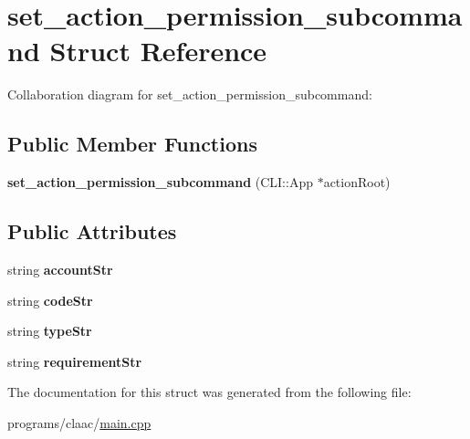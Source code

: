 \hypertarget{structset__action__permission__subcommand}{}\section{set\+\_\+action\+\_\+permission\+\_\+subcommand Struct Reference}
\label{structset__action__permission__subcommand}


Collaboration diagram for set\+\_\+action\+\_\+permission\+\_\+subcommand\+:
\subsection*{Public Member Functions}
\begin{DoxyCompactItemize}
\item 
\mbox{\label{structset__action__permission__subcommand_a21e2eff93402582965baf60440fb85b0}} 
{\bfseries set\+\_\+action\+\_\+permission\+\_\+subcommand} (C\+L\+I\+::\+App $\ast$action\+Root)
\end{DoxyCompactItemize}
\subsection*{Public Attributes}
\begin{DoxyCompactItemize}
\item 
\mbox{\label{structset__action__permission__subcommand_a19502b8e613dc2fc4f86e2583b04890c}} 
string {\bfseries account\+Str}
\item 
\mbox{\label{structset__action__permission__subcommand_af7f56bf710dd0532b918e9ba68e272ec}} 
string {\bfseries code\+Str}
\item 
\mbox{\label{structset__action__permission__subcommand_abe45d0fe0fe2f85e116e1ab5db3de828}} 
string {\bfseries type\+Str}
\item 
\mbox{\label{structset__action__permission__subcommand_aa780d520bd42512a47d21a46708f5696}} 
string {\bfseries requirement\+Str}
\end{DoxyCompactItemize}


The documentation for this struct was generated from the following file\+:\begin{DoxyCompactItemize}
\item 
programs/claac/\mbox{\hyperlink{programs_2claac_2main_8cpp}{main.\+cpp}}\end{DoxyCompactItemize}
